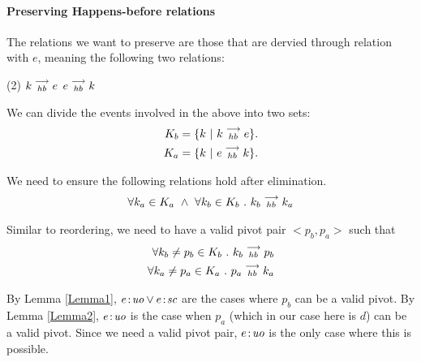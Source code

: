 \paragraph{Preserving Happens-before relations}
        
    The relations we want to preserve are those that are dervied through relation with $e$, meaning the following two relations:
    \begin{tasks}(2)
        \task $k\stackrel{\longrightarrow}{_{hb}}e$
        \task $e\stackrel{\longrightarrow}{_{hb}}k$
    \end{tasks}

    We can divide the events involved in the above into two sets:
    \begin{align*}
        K_b = \{k \ | \ k\stackrel{\longrightarrow}{_{hb}}e \}. \\
        K_a = \{k \ | \ e\stackrel{\longrightarrow}{_{hb}}k \}. 
    \end{align*}

    
    We need to ensure the following relations hold after elimination.
    \begin{align}
        \forall k_a \in K_a \ \wedge \ \forall k_b \in K_b \ . \ \reln{k_b}{hb}{k_a}
    \end{align}
    
    Similar to reordering, we need to have a valid pivot pair $<p_b, p_a>$ such that 
    \begin{align}
        \forall k_b \neq p_b \in K_b \ . \ k_b\stackrel{\longrightarrow}{_{hb}}p_b \\
        \forall k_a \neq p_a \in K_a \ . \ p_a\stackrel{\longrightarrow}{_{hb}}k_a 
    \end{align}

    By Lemma \ref{Lemma1}, $e\!:\!\textit{uo} \vee e\!:\!\textit{sc}$ are the cases where $p_b$ can be a valid pivot. 
    By Lemma \ref{Lemma2}, $e\!:\!\textit{uo}$ is the case when $p_a$ (which in our case here is $d$) can be a valid pivot. 
    Since we need a valid pivot pair, $e\!:\!\textit{uo}$ is the only case where this is possible. 

